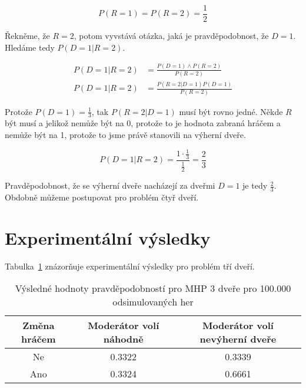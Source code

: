 \begin{equation}
    P(R = 1) = P(R = 2) = \frac{1}{2}
\end{equation}

Řekněme, že \( R = 2 \), potom vyvstává otázka, jaká je pravděpodobnost, že \( D = 1 \).
Hledáme tedy \( P(D = 1 | R = 2) \).

\begin{align}
    P(D = 1 | R = 2) &= \frac{P(D = 1) \land P(R = 2)}{P(R = 2)} \\
    P(D = 1 | R = 2) &= \frac{P(R = 2 | D = 1) P(D = 1)}{P(R = 2)}
\end{align}

Protože \( P(D = 1) = \frac{1}{3} \), tak \( P(R = 2 | D = 1) \) musí být rovno jedné.
Někde \( R \) být musí a jelikož nemůže být na 0, protože to je hodnota zabraná hráčem a nemůže být na 1, protože to jsme právě stanovili na výherní dveře.

\begin{equation}
    P(D = 1 | R = 2) = \frac{1 \cdot \frac{1}{3}}{\frac{1}{2}} = \frac{2}{3}
\end{equation}

Pravděpodobnost, že se výherní dveře nacházejí za dveřmi \( D = 1 \) je tedy \( \frac{2}{3} \).
Obdobně můžeme postupovat pro problém čtyř dveří.

\section{Experimentální výsledky}

Tabulka~\ref{table:table1} znázorňuje experimentální výsledky pro problém tří dveří.

\begin{table}[htb]
    \centering

    \begin{tabular}{ccc}
        \toprule

        Změna hráčem    & Moderátor volí náhodně    & Moderátor volí nevýherní dveře    \\ \midrule
        Ne              & 0.3322                    & 0.3339                            \\
        Ano             & 0.3324                    & 0.6661                            \\
          
        \bottomrule
    \end{tabular}

    \caption{Výsledné hodnoty pravděpodobností pro MHP 3 dveře pro 100.000 odsimulovaných her}
    \label{table:table1}
\end{table}
\FloatBarrier

